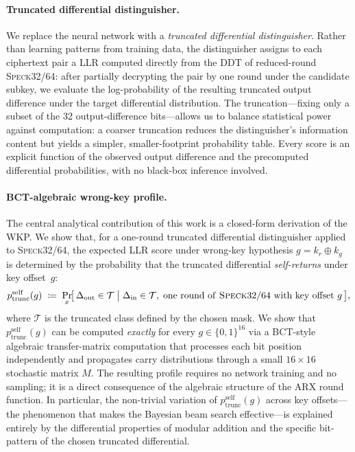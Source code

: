 \documentclass[runningheads]{llncs}
\newcommand{\pself}{p^{\mathrm{self}}_{\mathrm{trunc}}}
\newcommand{\speck}{\textsc{Speck}32/64}
\newcommand{\xor}{\oplus}
\begin{document}
\paragraph{Truncated differential distinguisher.}
We replace the neural network with a \emph{truncated differential
distinguisher}.  Rather than learning patterns from training data, the
distinguisher assigns to each ciphertext pair a LLR computed directly
from the DDT of reduced-round \speck{}: after partially decrypting the
pair by one round under the candidate subkey, we evaluate the
log-probability of the resulting truncated output difference under the
target differential distribution.  The truncation—fixing only a subset
of the 32 output-difference bits—allows us to balance statistical
power against computation: a coarser truncation reduces the
distinguisher's information content but yields a simpler,
smaller-footprint probability table.  Every score is an explicit
function of the observed output difference and the precomputed
differential probabilities, with no black-box inference involved.

\paragraph{BCT-algebraic wrong-key profile.}
The central analytical contribution of this work is a closed-form
derivation of the WKP.  We show that, for a one-round
truncated differential distinguisher applied to \speck{}, the
expected LLR score under wrong-key hypothesis $g = k_r \xor k_g$ is
determined by the probability that the truncated differential
\emph{self-returns} under key offset~$g$:
\begin{equation}
  \label{eq:pself-informal}
  \pself(g) \;\coloneqq\;
  \Pr_x\!\bigl[\,
    \Delta_{\mathrm{out}} \in \mathcal{T}
    \;\big|\;
    \Delta_{\mathrm{in}} \in \mathcal{T},\;
    \text{one round of \speck{} with key offset } g
  \,\bigr],
\end{equation}
where $\mathcal{T}$ is the truncated class defined by the chosen mask.
We show that $\pself(g)$ can be computed \emph{exactly} for every
$g \in \{0,1\}^{16}$ via a BCT-style algebraic transfer-matrix
computation that processes each bit position independently and
propagates carry distributions through a small $16 \times 16$
stochastic matrix $M$.  The resulting profile requires no network
training and no sampling; it is a direct consequence of the algebraic
structure of the ARX round function.  In particular, the non-trivial
variation of $\pself(g)$ across key offsets—the phenomenon that makes
the Bayesian beam search effective—is explained entirely by the
differential properties of modular addition and the specific
bit-pattern of the chosen truncated differential.
\end{document}
